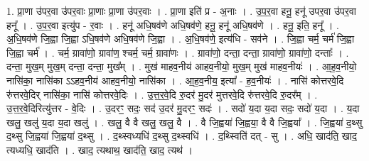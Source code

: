 \documentclass[17pt]{extarticle}
\begin{document}
1. प्रा॒णा उ॑पर॒वा उ॑पर॒वाः प्रा॒णाः प्रा॒णा उ॑पर॒वाः । . प्रा॒णा इति॑ प्र - अ॒नाः । . उ॒प॒र॒वा हनू॒ हनू॑ उपर॒वा उ॑पर॒वा हनू᳚ । . उ॒प॒र॒वा इत्यु॑प - र॒वाः । . हनू॑ अधि॒षव॑णे अधि॒षव॑णे॒ हनू॒ हनू॑ अधि॒षव॑णे । . हनू॒ इति॒ हनू᳚ । . अ॒धि॒षव॑णे जि॒ह्वा जि॒ह्वा ऽधि॒षव॑णे अधि॒षव॑णे जि॒ह्वा । . अ॒धि॒षव॑णे॒ इत्य॑धि - सव॑ने । . जि॒ह्वा चर्म॒ चर्म॑ जि॒ह्वा जि॒ह्वा चर्म॑ । . चर्म॒ ग्रावा॑णो॒ ग्रावा॑ण॒ श्चर्म॒ चर्म॒ ग्रावा॑णः । . ग्रावा॑णो॒ दन्ता॒ दन्ता॒ ग्रावा॑णो॒ ग्रावा॑णो॒ दन्ताः᳚ । . दन्ता॒ मुख॒म् मुख॒म् दन्ता॒ दन्ता॒ मुख᳚म् । . मुख॑ माहव॒नीय॑ आहव॒नीयो॒ मुख॒म् मुख॑ माहव॒नीयः॑ । . आ॒ह॒व॒नीयो॒ नासि॑का॒ नासि॑का ऽऽहव॒नीय॑ आहव॒नीयो॒ नासि॑का । . आ॒ह॒व॒नीय॒ इत्या᳚ - ह॒व॒नीयः॑ । . नासि॑ कोत्तरवे॒दि रु॑त्तरवे॒दिर् नासि॑का॒ नासि॑ कोत्तरवे॒दिः । . उ॒त्त॒र॒वे॒दि रु॒दर॑ मु॒दर॑ मुत्तरवे॒दि रु॑त्तरवे॒दि रु॒दर᳚म् । . उ॒त्त॒र॒वे॒दिरित्यु॑त्तर - वे॒दिः । . उ॒दरꣳ॒॒ सदः॒ सद॑ उ॒दर॑ मु॒दरꣳ॒॒ सदः॑ । . सदो॑ य॒दा य॒दा सदः॒ सदो॑ य॒दा । . य॒दा खलु॒ खलु॑ य॒दा य॒दा खलु॑ । . खलु॒ वै वै खलु॒ खलु॒ वै । . वै जि॒ह्वया॑ जि॒ह्वया॒ वै वै जि॒ह्वया᳚ । . जि॒ह्वया॑ द॒थ्सु द॒थ्सु जि॒ह्वया॑ जि॒ह्वया॑ द॒थ्सु । . द॒थ्स्वध्यधि॑ द॒थ्सु द॒थ्स्वधि॑ । . द॒थ्स्विति॑ दत् - सु । . अधि॒ खाद॑ति॒ खाद॒ त्यध्यधि॒ खाद॑ति । . खाद॒ त्यथाथ॒ खाद॑ति॒ खाद॒ त्यथ॑ । \newline
\end{document}
